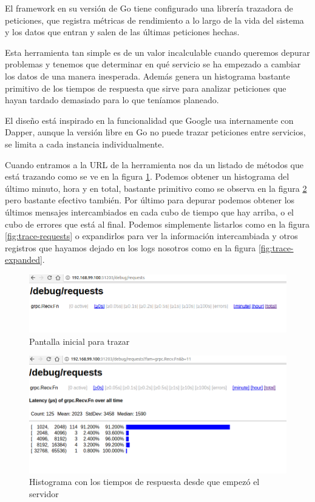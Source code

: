 El framework en su versión de Go tiene configurado una librería trazadora de peticiones\cite{nettrace}, que registra métricas de rendimiento a lo largo de la vida del sistema y los datos que entran y salen de las últimas peticiones hechas.

Esta herramienta tan simple es de un valor incalculable cuando queremos depurar problemas y tenemos que determinar en qué servicio se ha empezado a cambiar los datos de una manera inesperada. Además genera un histograma bastante primitivo de los tiempos de respuesta que sirve para analizar peticiones que hayan tardado demasiado para lo que teníamos planeado.

El diseño está inspirado en la funcionalidad que Google usa internamente con Dapper\cite{36356}, aunque la versión libre en Go no puede trazar peticiones entre servicios, se limita a cada instancia individualmente.

Cuando entramos a la URL de la herramienta nos da un listado de métodos que está trazando como se ve en la figura \ref{fig:trace-dashboard}. Podemos obtener un histograma del último minuto, hora y en total, bastante primitivo como se observa en la figura \ref{fig:trace-histogram} pero bastante efectivo también. Por último para depurar podemos obtener los últimos mensajes intercambiados en cada cubo de tiempo que hay arriba, o el cubo de errores que está al final. Podemos simplemente listarlos como en la figura \ref{fig:trace-requests} o expandirlos para ver la información intercambiada y otros registros que hayamos dejado en los logs nosotros como en la figura \ref{fig:trace-expanded}.

\begin{figure}[H]
    \centering
    \includegraphics[width=\textwidth]{../images/trace/dashboard.png}
    \caption{Pantalla inicial para trazar}
    \label{fig:trace-dashboard}
\end{figure}

\begin{figure}[H]
    \centering
    \includegraphics[width=\textwidth]{../images/trace/histogram.png}
    \caption{Histograma con los tiempos de respuesta desde que empezó el servidor}
    \label{fig:trace-histogram}
\end{figure}

